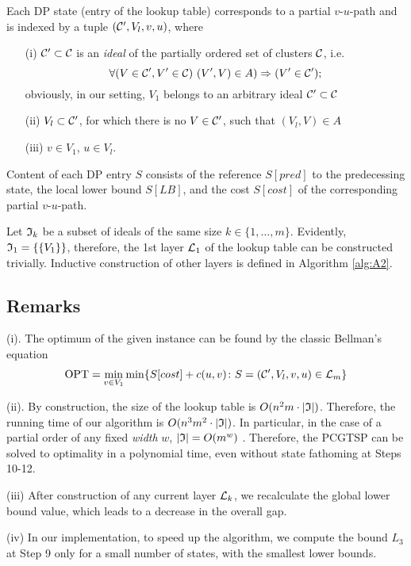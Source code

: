 Each DP state  (entry of the lookup table) corresponds to a partial $v$-$u$-path and is indexed by a tuple $(\mathcal{C}',V_l,v, u)$, where
\begin{itemize}
  \item[(i)] $\mathcal{C}'\subset \mathcal{C}$ is an \textit{ideal} of the partially ordered set of clusters $\mathcal{C}$, i.e.
  \[
    \forall (V\in\mathcal{C}', V'\in\mathcal{C})\   (V',V)\in A) \Rightarrow (V'\in\mathcal{C}');
  \]
  obviously, in our setting, $V_1$ belongs to an arbitrary ideal $\mathcal{C}'\subset\mathcal{C}$

  \item[(ii)] $V_l\subset\mathcal{C}'$, for which there is no $V\in \mathcal{C}'$, such that $(V_l,V)\in A$
  \item[(iii)] $v\in V_1$, $u\in V_l$.
\end{itemize}
Content of each DP entry $S$ consists of the reference $S[pred]$ to the predecessing state, the local lower bound $S[LB]$, and the cost $S[cost]$ of the corresponding partial $v$-$u$-path.

Let $\mathfrak{I}_k$ be a subset of ideals of the same size $k\in\{1,\ldots,m\}$. Evidently, $\mathfrak{I}_1=\{\{V_1\}\}$, therefore, the 1st layer $\mathcal{L}_1$ of the lookup table can be constructed trivially. Inductive construction of other layers is defined in Algorithm \ref{alg:A2}.

\subsection{Remarks}
(i). The optimum of the given instance can be found by the classic Bellman's equation
\[
  \mathrm{OPT}=\min_{v\in V_1}\min\{S[cost]+c(u,v)\colon S=(\mathcal{C}',V_l, v, u)\in\mathcal{L}_m\}
\]

\noindent
(ii). By construction, the size of the lookup table is $O(n^2m\cdot |\mathfrak{I}|)$. Therefore, the running time of our algorithm is $O(n^3m^2\cdot |\mathfrak{I}|)$. In particular, in the case of a partial order of any fixed \textit{width} $w$, $|\mathfrak{I}|=O(m^w)$ \cite{Steiner-1990}. Therefore, the PCGTSP can be solved to optimality in a polynomial time, even without state fathoming at Steps 10-12.

\noindent
(iii) After construction of any current layer $\mathcal{L}_k$, we recalculate the global lower bound value, which leads to a decrease in the overall gap.

\noindent
(iv) In our implementation, to speed up the algorithm, we compute the bound $L_3$ at Step 9 only for a small number of states, with the smallest lower bounds.

